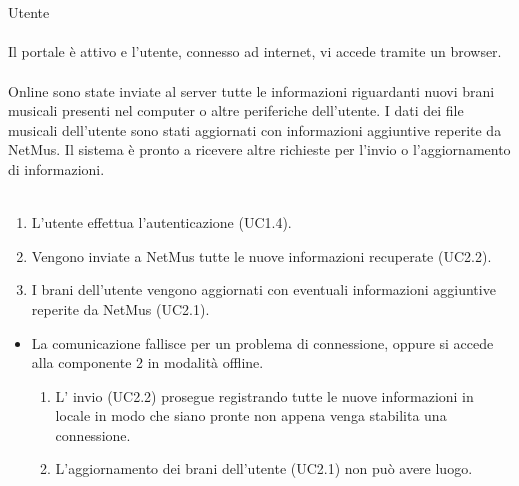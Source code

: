\vspace*{0.5cm}
\\\\
 Utente \\\\
 Il portale \`e attivo e l'utente, connesso ad internet, vi
accede tramite un browser. \\\\ 
 Online sono state inviate al server tutte le
informazioni riguardanti nuovi brani musicali presenti nel computer o altre periferiche
dell'utente. I dati dei file musicali dell'utente sono stati aggiornati con
informazioni aggiuntive reperite da NetMus. Il sistema \`e pronto a ricevere altre
richieste per l'invio o l'aggiornamento di informazioni. \\\\
\begin{enumerate}
  \item L'utente effettua l'autenticazione (UC1.4).
  \item Vengono inviate a NetMus tutte le nuove informazioni recuperate (UC2.2).
  \item I brani dell'utente vengono aggiornati con eventuali informazioni
  aggiuntive reperite da NetMus (UC2.1).
\end{enumerate}
\begin{itemize}
  \item La comunicazione fallisce per un problema di connessione, oppure si
  accede alla componente 2 in modalit\`a offline.
  \begin {enumerate}
    \item L' invio (UC2.2) prosegue registrando tutte le nuove informazioni
    in locale in modo che siano pronte non appena venga stabilita una
    connessione.
    \item L'aggiornamento dei brani dell'utente (UC2.1) non pu\`o avere luogo.
  \end{enumerate}
\end{itemize}
\newpage

